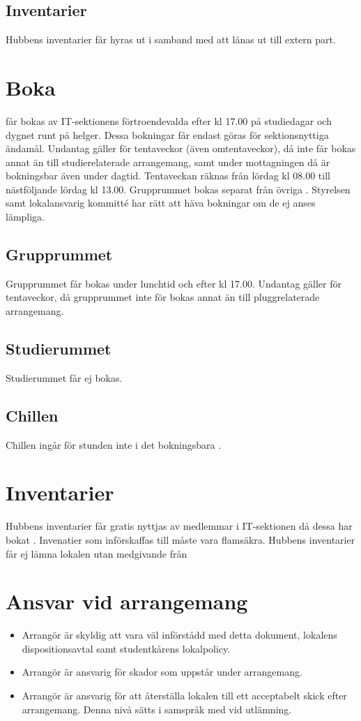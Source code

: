 \documentclass[11pt, includeaddress]{classes/cthit}
\begin{document}
\subsection{Inventarier}
Hubbens inventarier får hyras ut i samband med att \HUBBEN lånas ut till extern part.


\section{Boka}
\HUBBEN får bokas av IT-­sektionens förtroendevalda efter kl 17.00 på studiedagar och dygnet runt på helger. Dessa bokningar får endast göras för sektionsnyttiga ändamål. Undantag gäller för tentaveckor (även omtentaveckor), då \HUBBEN inte får bokas annat än till studierelaterade arrangemang, samt under mottagningen då \HUBBEN är bokningsbar även under dagtid. Tentaveckan räknas från lördag kl 08.00 till nästföljande lördag kl 13.00. Grupprummet bokas separat från övriga \HUBBEN. Styrelsen samt lokalansvarig kommitté har rätt att häva bokningar om de ej anses lämpliga. 

\subsection{Grupprummet}
Grupprummet får bokas under lunchtid och efter kl 17.00. Undantag gäller för tentaveckor, då grupprummet inte för bokas annat än till pluggrelaterade arrangemang.

\subsection{Studierummet}
Studierummet får ej bokas.

\subsection{Chillen}
Chillen ingår för stunden inte i det bokningsbara \HUBBEN. 


\section{Inventarier}
Hubbens inventarier får gratis nyttjas av medlemmar i IT­-sektionen då dessa har bokat \HUBBEN. Invenatier som införskaffas till \HUBBEN måste vara flamsäkra. Hubbens inventarier får ej lämna lokalen utan medgivande från \PRIT 

\section{Ansvar vid arrangemang}
\begin{itemize}
	\item Arrangör är skyldig att vara väl införstådd med detta dokument, lokalens dispositionsavtal samt studentkårens lokalpolicy. 
	\item Arrangör är ansvarig för skador som uppstår under arrangemang. 
	\item Arrangör är ansvarig för att återställa lokalen till ett acceptabelt skick efter arrangemang. Denna nivå sätts i samspråk med \PRIT vid utlämning.
\end{itemize}
\end{document}

